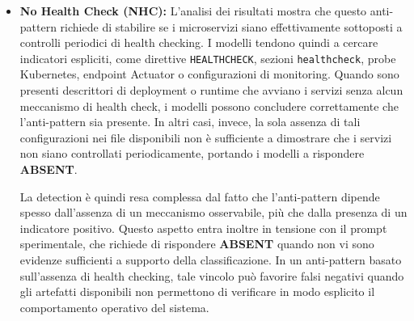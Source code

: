 \begin{itemize}
    I falsi negativi osservati dipendono soprattutto dal modo in cui il prompt definisce l'anti-pattern. La definizione, infatti, non richiede solo l'assenza di un gateway, ma insiste anche sul fatto che i client debbano chiamare direttamente i microservizi. Di conseguenza, quando il modello trova un unico punto di ingresso pubblico, un frontend esposto verso l'esterno oppure un componente con funzioni di routing, tende a concludere che il difetto non sia presente o comunque non sia dimostrabile.
    
    Un esempio significativo è rappresentato dai casi in cui il modello osserva che solo il servizio \textit{webui} è pubblicato verso l'esterno, mentre gli altri servizi restano esposti solo internamente. In una situazione di questo tipo, l'LLM tende a interpretare la \textit{webui} come evidenza sufficiente di un punto di accesso centralizzato, escludendo così l'anti-pattern. Tuttavia, la presenza di un unico frontend pubblico non coincide necessariamente con l'esistenza di un vero API gateway dedicato.
    Bisogna specificare, che la definizione porta il modello a ragionare in questo modo, quindi anche in questo caso migliorando la definizione a cui è ancorata il prompt, si potrebbero risolvere alcuni di questi falsi-negativi.



    \item \textbf{No Health Check (NHC):} L'analisi dei risultati mostra che questo anti-pattern richiede di stabilire se i microservizi siano effettivamente sottoposti a controlli periodici di health checking. I modelli tendono quindi a cercare indicatori espliciti, come direttive \texttt{HEALTHCHECK}, sezioni \texttt{healthcheck}, probe Kubernetes, endpoint Actuator o configurazioni di monitoring. Quando sono presenti descrittori di deployment o runtime che avviano i servizi senza alcun meccanismo di health check, i modelli possono concludere correttamente che l'anti-pattern sia presente. In altri casi, invece, la sola assenza di tali configurazioni nei file disponibili non è sufficiente a dimostrare che i servizi non siano controllati periodicamente, portando i modelli a rispondere \textbf{ABSENT}.

    La detection è quindi resa complessa dal fatto che l'anti-pattern dipende spesso dall'assenza di un meccanismo osservabile, più che dalla presenza di un indicatore positivo. Questo aspetto entra inoltre in tensione con il prompt sperimentale, che richiede di rispondere \textbf{ABSENT} quando non vi sono evidenze sufficienti a supporto della classificazione. In un anti-pattern basato sull'assenza di health checking, tale vincolo può favorire falsi negativi quando gli artefatti disponibili non permettono di verificare in modo esplicito il comportamento operativo del sistema.



\end{itemize}

